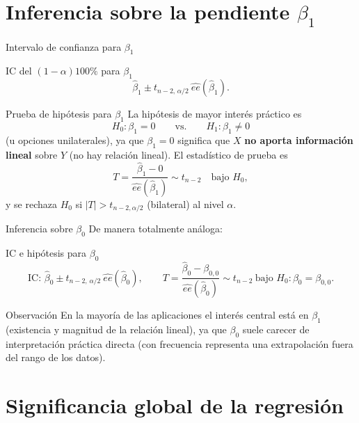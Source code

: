 \documentclass[aspectratio=169,11pt]{beamer}
\begin{document}
\section{Inferencia sobre la pendiente $\beta_1$}

\begin{frame}{Intervalo de confianza para $\beta_1$}
\begin{block}{IC del $(1-\alpha)100\%$ para $\beta_1$}
\[
\hat\beta_1 \pm t_{n-2,\,\alpha/2}\ \widehat{ee}(\hat\beta_1).
\]
\end{block}

\begin{block}{Prueba de hipótesis para $\beta_1$}
La hipótesis de mayor interés práctico es
\[
H_0: \beta_1 = 0 \qquad \text{vs.} \qquad H_1: \beta_1 \neq 0
\]
(u opciones unilaterales), ya que $\beta_1=0$ significa que $X$ \textbf{no aporta información lineal} sobre $Y$ (no hay relación lineal). El estadístico de prueba es
\[
T = \frac{\hat\beta_1 - 0}{\widehat{ee}(\hat\beta_1)} \sim t_{n-2} \quad \text{bajo } H_0,
\]
y se rechaza $H_0$ si $|T| > t_{n-2,\alpha/2}$ (bilateral) al nivel $\alpha$.
\end{block}
\end{frame}

\begin{frame}{Inferencia sobre $\beta_0$}
De manera totalmente análoga:

\begin{block}{IC e hipótesis para $\beta_0$}
\[
\text{IC: } \hat\beta_0 \pm t_{n-2,\,\alpha/2}\ \widehat{ee}(\hat\beta_0), \qquad
T = \frac{\hat\beta_0-\beta_{0,0}}{\widehat{ee}(\hat\beta_0)} \sim t_{n-2} \ \text{bajo } H_0:\beta_0=\beta_{0,0}.
\]
\end{block}

\begin{alertblock}{Observación}
En la mayoría de las aplicaciones el interés central está en $\beta_1$ (existencia y magnitud de la relación lineal), ya que $\beta_0$ suele carecer de interpretación práctica directa (con frecuencia representa una extrapolación fuera del rango de los datos).
\end{alertblock}
\end{frame}

\section{Significancia global de la regresión}
\end{document}
